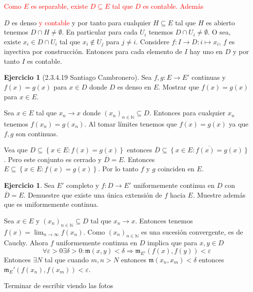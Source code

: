 \documentclass[12pt]{article}
\theoremstyle{plain}
\theoremstyle{definition}
\newtheorem{Ej}[Th]{Ejercicio}
\theoremstyle{remark}
\numberwithin{equation}{section}
\newcommand{\bN}{\mathbb{N}}        %
\newcommand{\mm}{\mathfrak{m}}      %
\renewcommand{\:}{\colon}           %
\newcommand{\conj}[1]{\left\lbrace#1\right\rbrace}
\begin{document}
\begin{multicols}{2}
\begin{ptcb}
\textcolor{red}{Como $E$ es separable, existe $D\subseteq E$ tal que $D$ es contable. Además} \par
$D$ es denso \textcolor{red}{y contable} y por tanto para cualquier $H\subseteq E$ tal que $H$ es abierto tenemos $D\cap H\neq \emptyset$. En particular para cada $U_i$ tenemos $D\cap U_i\neq \emptyset$. O sea, existe $x_i\in D\cap U_i$ tal que $x_i\not\in U_j$ para $j\neq i$. Considere $f\colon I\to D\colon i\mapsto x_i$, $f$ es inyectiva por construcción. Entonces para cada elemento de $I$ hay uno en $D$ y por tanto $I$ es contable.
\end{ptcb}

\begin{Ej}[2.3.4.19 Santiago Cambronero]
  Sea $f,g\colon E\to E'$ continuas y $f(x)=g(x)$ para $x\in D$ donde $D$ es denso en $E$. Mostrar que $f(x)=g(x)$ para $x\in E$.
\end{Ej}

\begin{ptcb}
Sea $x\in E$ tal que $x_n\to x$ donde $(x_n)_{n\in\bN}\subseteq D$. Entonces para cualquier $x_n$ tenemos $f(x_n)=g(x_n)$. Al tomar límites tenemos que $f(x)=g(x)$ ya que $f,g$ son continuas.
\end{ptcb}

\begin{ptcb}
Vea que $D\subseteq\conj{x\in E\colon f(x)=g(x)}$ entonces $\overline{D}\subseteq \overline{\conj{x\in E\colon f(x)=g(x)}}$. Pero este conjunto es cerrado y $\overline{D}=E$. Entonces $E\subseteq\conj{x\in E\colon f(x)=g(x)}$. Por lo tanto $f$ y $g$ coinciden en $E$.
\end{ptcb}

\begin{Ej}
  Sea $E'$ completo y $f\colon D\to E'$ uniformemente continua en $D$ con $\overline{D}=E$. Demuestre que existe una única extensión de $f$ hacia $E$. Muestre además que es uniformemente continua.
\end{Ej}

\begin{ptcb}
Sea $x\in E$ y $(x_n)_{n\in\bN}\subseteq D$ tal que $x_n\to x$. Entonces tenemos $f(x)=\lim_{n\to\infty}f(x_n)$. Como $(x_n)_{n\in\bN}$ es una sucesión convergente, es de Cauchy. Ahora $f$ uniformemente continua en $D$ implica que para $x,y\in D$
$$\forall\varepsilon>0\exists\delta>0\colon \mm(x,y)<\delta \Rightarrow\mm_{E'}(f(x),f(y))<\varepsilon$$
Entonces $\exists N$ tal que cuando $m,n>N$ entonces $\mm(x_n,x_m)<\delta$ entonces $\mm_{E}'(f(x_n),f(x_m))<\varepsilon$. \par
Terminar de escribir viendo las fotos
\end{ptcb}


\end{multicols}
\end{document}
